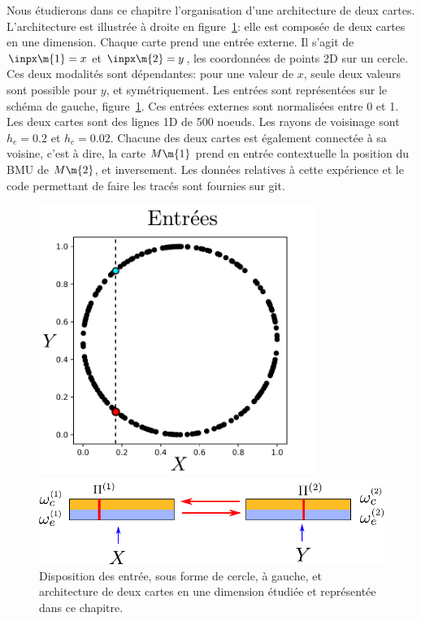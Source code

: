Nous étudierons dans ce chapitre l'organisation d'une architecture de deux cartes. L'architecture est illustrée à droite en figure~\ref{fig:exp}: elle est composée de deux cartes en une dimension. Chaque carte prend une entrée externe. Il s'agit de $\inpx\m{1}=x$ et $\inpx\m{2}=y$, les coordonnées de points 2D sur un cercle. Ces deux modalités sont dépendantes: pour une valeur de $x$, seule deux valeurs sont possible pour $y$, et symétriquement. Les entrées sont représentées sur le schéma de gauche, figure~\ref{fig:exp}.
Ces entrées externes sont normalisées entre 0 et 1. Les deux cartes sont des lignes 1D de 500 noeuds. Les rayons de voisinage sont $h_e = 0.2$ et $h_c = 0.02$.
Chacune des deux cartes est également connectée à sa voisine, c'est à dire, la carte $M\m{1}$ prend en entrée contextuelle la position du BMU de $M\m{2}$, et inversement.
Les données relatives à cette expérience et le code permettant de faire les tracés sont fournies sur git.

\begin{figure}
\begin{minipage}{0.4\textwidth}
\centering
\includegraphics[width=0.8\textwidth]{2som_inp_noinformation}
\end{minipage}
\begin{minipage}{0.6\textwidth}
\includegraphics[width=\textwidth]{2som_archi}
\end{minipage}
\caption{Disposition des entrée, sous forme de cercle, à gauche, et architecture de deux cartes en une dimension étudiée et représentée dans ce chapitre.\label{fig:exp}}
\end{figure}
